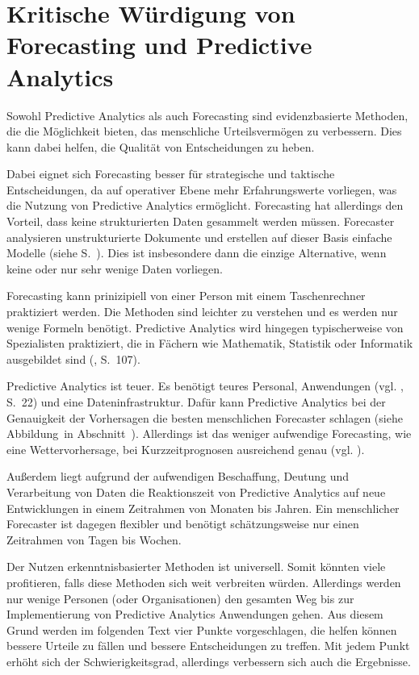 \section{Kritische Würdigung von Forecasting und Predictive Analytics}

Sowohl Predictive Analytics als auch Forecasting sind evidenzbasierte Methoden,
die die Möglichkeit bieten, das menschliche Urteilsvermögen zu verbessern. Dies
kann dabei helfen, die Qualität von Entscheidungen zu heben.

Dabei eignet sich Forecasting besser für strategische und taktische Entscheidungen,
da auf operativer Ebene mehr Erfahrungswerte vorliegen, was die Nutzung von
Predictive Analytics ermöglicht. Forecasting hat allerdings den Vorteil, dass
keine strukturierten Daten gesammelt werden müssen. Forecaster analysieren unstrukturierte
Dokumente und erstellen auf dieser Basis einfache Modelle (siehe S.~\xcom).
Dies ist insbesondere dann die einzige Alternative, wenn keine oder nur sehr wenige
Daten vorliegen.

Forecasting kann prinizipiell von einer Person mit einem Taschenrechner praktiziert
werden. Die Methoden sind leichter zu verstehen und es werden nur wenige Formeln benötigt.
Predictive Analytics wird hingegen typischerweise von Spezialisten praktiziert, 
die in Fächern wie Mathematik, Statistik oder Informatik ausgebildet sind (\cite{Gluchowski}, S.~107).

Predictive Analytics ist teuer. Es benötigt teures Personal, Anwendungen (vgl. \cite{Iffert}, S.~22) und eine
Dateninfrastruktur. Dafür kann Predictive Analytics bei der
Genauigkeit der Vorhersagen die besten menschlichen Forecaster schlagen (siehe Abbildung~\xcom in Abschnitt~\xcom).
Allerdings ist das weniger aufwendige Forecasting, wie eine Wettervorhersage, bei Kurzzeitprognosen ausreichend genau
(vgl. \cite{Economist}).

Außerdem liegt aufgrund der aufwendigen Beschaffung, Deutung und Verarbeitung von Daten die Reaktionszeit von
Predictive Analytics auf neue Entwicklungen in einem Zeitrahmen von Monaten bis Jahren. Ein menschlicher Forecaster
ist dagegen flexibler und benötigt schätzungsweise nur einen Zeitrahmen von Tagen bis Wochen.

Der Nutzen erkenntnisbasierter Methoden ist universell. Somit könnten viele profitieren,
falls diese Methoden sich weit verbreiten würden. Allerdings werden nur wenige Personen
(oder Organisationen) den gesamten Weg bis zur Implementierung von Predictive Analytics
Anwendungen gehen. Aus diesem Grund werden im folgenden Text vier Punkte vorgeschlagen,
die helfen können bessere Urteile zu fällen und bessere Entscheidungen zu treffen. Mit jedem
Punkt erhöht sich der Schwierigkeitsgrad, allerdings verbessern sich auch die Ergebnisse.

